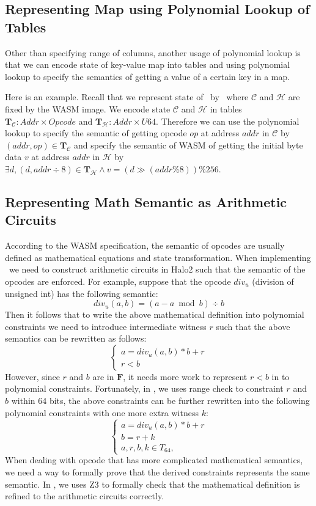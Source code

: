 \subsection{Representing Map using Polynomial Lookup of Tables}
\label{chp:map-repr}
Other than specifying range of columns, another usage of polynomial lookup is that we can encode state of key-value map into tables and using polynomial lookup to specify the semantics of getting a value of a certain key in a map. 

Here is an example. Recall that we represent state of \zkwasm\, by \fullstate \, where $\mathcal{C}$ and $\mathcal{H}$ are fixed by the WASM image. We encode state $\mathcal{C}$ and $\mathcal{H}$ in tables $\mathbf{T}_\mathcal{C} : Addr \times Opcode$ and $\mathbf{T}_\mathcal{H}: Addr \times U64$. Therefore we can use the polynomial lookup to specify the semantic of getting opcode $op$ at address $addr$ in $\mathcal{C}$ by $(addr, op) \in \mathbf{T}_\mathcal{C}$ and specify the semantic of WASM of getting the initial byte data $v$ at address $addr$ in $\mathcal{H}$ by $\exists d, (d, addr \div 8) \in \mathbf{T}_\mathcal{H} \wedge v = (d \gg (addr \% 8)) \% 256$.

\subsection{Representing Math Semantic as Arithmetic Circuits}
According to the WASM specification, the semantic of opcodes are usually defined as mathematical equations and state transformation. When implementing \zkwasm \, we need to construct arithmetic circuits in Halo2 such that the semantic of the opcodes are enforced. For example, suppose that the opcode $div_u$ (division of unsigned int) has the following semantic:
\[ div_u(a, b) = (a - a \bmod b) \div b \] 
Then it follows that to write the above mathematical definition into polynomial constraints we need to introduce intermediate witness $r$ such that the above semantics can be rewritten as follows:
\begin{equation}
\begin{cases}
    a = div_u(a,b) * b + r \\
    r < b
\end{cases}
\end{equation}
However, since $r$ and $b$ are in $\mathbf{F}$, it needs more work to represent $r < b$ in to polynomial constraints. Fortunately, in \zkwasm, we uses range check to constraint $r$ and $b$ within 64 bits, the above constraints can be further rewritten into the following polynomial constraints with one more extra witness $k$: 
\begin{equation}
\begin{cases}
    a = div_u(a,b) * b + r \\
    b = r + k \\
    a, r, b, k\in T_{64}, 
\end{cases}
\end{equation}
When dealing with opcode that has more complicated mathematical semantics, we need a way to formally prove that the derived constraints represents the same semantic. In \zkwasm, we uses Z3 to formally check that the mathematical definition is refined to the arithmetic circuits correctly.

